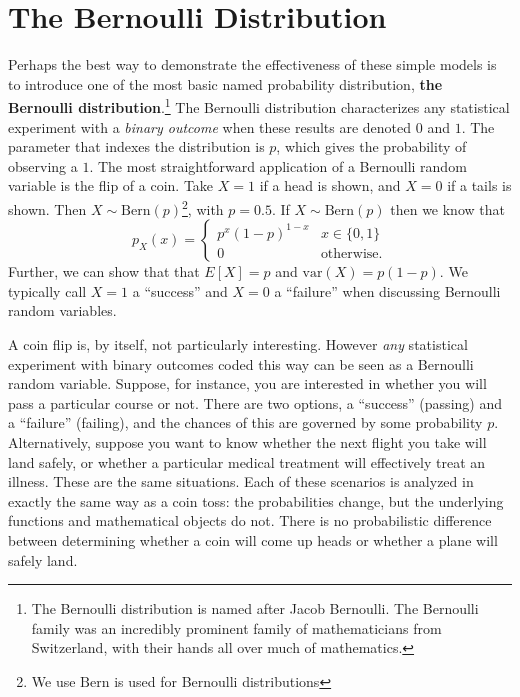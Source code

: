\documentclass[
  letterpaper,
  DIV=11,
  numbers=noendperiod]{scrreprt}
\theoremstyle{definition}
\theoremstyle{definition}
\theoremstyle{definition}
\theoremstyle{remark}
\begin{document}
\section{The Bernoulli Distribution}\label{the-bernoulli-distribution}

Perhaps the best way to demonstrate the effectiveness of these simple
models is to introduce one of the most basic named probability
distribution, \textbf{the Bernoulli distribution}.\footnote{The
  Bernoulli distribution is named after Jacob Bernoulli. The Bernoulli
  family was an incredibly prominent family of mathematicians from
  Switzerland, with their hands all over much of mathematics.} The
Bernoulli distribution characterizes any statistical experiment with a
\emph{binary outcome} when these results are denoted \(0\) and \(1\).
The parameter that indexes the distribution is \(p\), which gives the
probability of observing a \(1\). The most straightforward application
of a Bernoulli random variable is the flip of a coin. Take \(X=1\) if a
head is shown, and \(X=0\) if a tails is shown. Then
\(X\sim\text{Bern}(p)\)\footnote{We use \(\text{Bern}\) is used for
  Bernoulli distributions}, with \(p=0.5\). If \(X\sim\text{Bern}(p)\)
then we know that
\[p_X(x) = \begin{cases} p^x(1-p)^{1-x} & x\in\{0,1\}\\ 0 & \text{otherwise}.\end{cases}\]
Further, we can show that that \(E[X] = p\) and
\(\text{var}(X) = p(1-p)\). We typically call \(X=1\) a ``success'' and
\(X=0\) a ``failure'' when discussing Bernoulli random variables.

A coin flip is, by itself, not particularly interesting. However
\emph{any} statistical experiment with binary outcomes coded this way
can be seen as a Bernoulli random variable. Suppose, for instance, you
are interested in whether you will pass a particular course or not.
There are two options, a ``success'' (passing) and a ``failure''
(failing), and the chances of this are governed by some probability
\(p\). Alternatively, suppose you want to know whether the next flight
you take will land safely, or whether a particular medical treatment
will effectively treat an illness. These are the same situations. Each
of these scenarios is analyzed in exactly the same way as a coin toss:
the probabilities change, but the underlying functions and mathematical
objects do not. There is no probabilistic difference between determining
whether a coin will come up heads or whether a plane will safely land.
\end{document}
